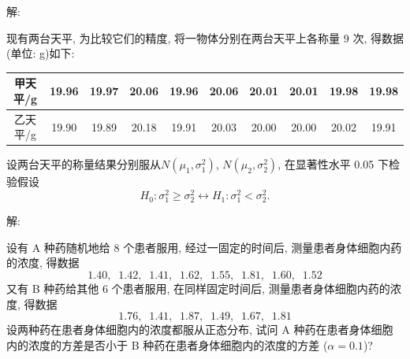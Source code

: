 \documentclass[standard]{ExBook}
\begin{document}
\begin{qitems}
\vspace{-5em}

    \begin{bbox}
解: 
    \end{bbox}

\vspace{-5em}

    \begin{bbox}
    \begin{shaded}
        \qitem
现有两台天平, 为比较它们的精度, 将一物体分别在两台天平上各称量 9 次, 得数据(单位: g)如下:
\begin{center}
\setlength{\tabcolsep}{10pt}
\begin{tabular}{c|ccccccccc}
\hline
甲天平/g & 19.96 & 19.97 & 20.06 & 19.96 & 20.06 & 20.01 & 20.01 & 19.98 & 19.98 \\
\hline
乙天平/g & 19.90 & 19.89 & 20.18 & 19.91 & 20.03 & 20.00 & 20.00 & 20.02 & 19.91 \\
\hline
\end{tabular}
\end{center}
设两台天平的称量结果分别服从$N(\mu_1,\sigma_1^2)$, $N(\mu_2,\sigma_2^2)$, 在显著性水平 0.05 下检验假设
$$H_0 : \sigma_1^2 \geq \sigma_2^2 \longleftrightarrow H_1 : \sigma_1^2 < \sigma_2^2.$$
    \end{shaded}
    \end{bbox}

\vspace{-5em}

    \begin{bbox}
解: 
    \end{bbox}

\vspace{-5em}

    \begin{bbox}
    \begin{shaded}
        \qitem
设有 A 种药随机地给 8 个患者服用, 经过一固定的时间后, 测量患者身体细胞内药的浓度, 得数据
$$1.40, \;\; 1.42, \;\; 1.41, \;\; 1.62, \;\; 1.55, \;\; 1.81, \;\; 1.60, \;\; 1.52$$
又有 B 种药给其他 6 个患者服用, 在同样固定时间后, 测量患者身体细胞内药的浓度, 得数据
$$1.76, \;\; 1.41, \;\; 1.87, \;\; 1.49, \;\; 1.67, \;\; 1.81$$
设两种药在患者身体细胞内的浓度都服从正态分布, 试问 A 种药在患者身体细胞内的浓度的方差是否小于 B 种药在患者身体细胞内的浓度的方差 ($\alpha=0.1$)?
    \end{shaded}
    \end{bbox}

\vspace{-5em}


\end{qitems}
\end{document}
